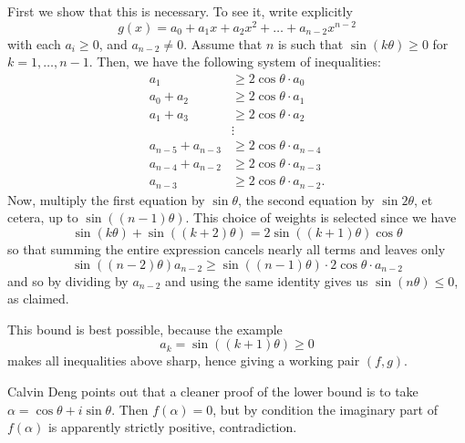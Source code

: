 \documentclass[11pt]{scrartcl}
\begin{document}
First we show that this is necessary.
To see it, write explicitly
\[ g(x) = a_0 + a_1 x + a_2 x^2 + \dots + a_{n-2} x^{n-2} \]
with each $a_i \ge 0$, and $a_{n-2} \neq 0$.
Assume that $n$ is such that $\sin(k\theta) \ge 0$ for $k=1,\dots,n-1$.
Then, we have the following system of inequalities:
\begin{align*}
  a_1 &\ge 2 \cos \theta \cdot a_0 \\
  a_0 + a_2 &\ge 2 \cos \theta \cdot a_1 \\
  a_1 + a_3 &\ge 2 \cos \theta \cdot a_2 \\
  &\vdots \\
  a_{n-5} + a_{n-3} &\ge 2 \cos \theta \cdot a_{n-4} \\
  a_{n-4} + a_{n-2} &\ge 2 \cos \theta \cdot a_{n-3} \\
  a_{n-3} &\ge 2 \cos \theta \cdot a_{n-2}.
\end{align*}
Now, multiply the first equation by $\sin\theta$,
the second equation by $\sin2\theta$, et cetera,
up to $\sin\left( (n-1)\theta \right)$.
This choice of weights is selected since we have
\[ \sin \left( k\theta \right) + \sin\left( (k+2)\theta \right)
  = 2 \sin\left( (k+1)\theta \right) \cos \theta \]
so that summing the entire expression
cancels nearly all terms and leaves only
\[ \sin\left( (n-2)\theta \right) a_{n-2}
  \ge \sin\left( (n-1)\theta  \right) \cdot 2\cos\theta \cdot a_{n-2} \]
and so by dividing by $a_{n-2}$ and using the same identity
gives us $\sin(n\theta) \le 0$, as claimed.

This bound is best possible, because the example
\[ a_k = \sin\left( (k+1)\theta \right) \ge 0 \]
makes all inequalities above sharp, hence giving
a working pair $(f,g)$.

\begin{remark*}
Calvin Deng points out that a cleaner proof of the lower bound
is to take $\alpha = \cos \theta + i \sin \theta$.
Then $f(\alpha) = 0$, but by condition the imaginary part of $f(\alpha)$
is apparently strictly positive, contradiction.
\end{remark*}
\end{document}
